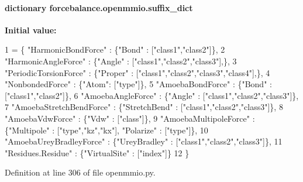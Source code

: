 \hypertarget{namespaceforcebalance_1_1openmmio_aeca37c08912f1a88339680ed75839530}{
\paragraph[{suffix\-\_\-dict}]{\setlength{\rightskip}{0pt plus 5cm}dictionary forcebalance.\-openmmio.\-suffix\-\_\-dict}}\label{namespaceforcebalance_1_1openmmio_aeca37c08912f1a88339680ed75839530}
{\bfseries Initial value\-:}
\begin{DoxyCode}
1 = \{ \textcolor{stringliteral}{"HarmonicBondForce"} : \{\textcolor{stringliteral}{"Bond"} : [\textcolor{stringliteral}{"class1"},\textcolor{stringliteral}{"class2"}]\},
2                 \textcolor{stringliteral}{"HarmonicAngleForce"} : \{\textcolor{stringliteral}{"Angle"} : [\textcolor{stringliteral}{"class1"},\textcolor{stringliteral}{"class2"},\textcolor{stringliteral}{"class3"}],\},
3                 \textcolor{stringliteral}{"PeriodicTorsionForce"} : \{\textcolor{stringliteral}{"Proper"} : [\textcolor{stringliteral}{"class1"},\textcolor{stringliteral}{"class2"},\textcolor{stringliteral}{"class3"},\textcolor{stringliteral}{"class4"}],\},
4                 \textcolor{stringliteral}{"NonbondedForce"} : \{\textcolor{stringliteral}{"Atom"}: [\textcolor{stringliteral}{"type"}]\},
5                 \textcolor{stringliteral}{"AmoebaBondForce"} : \{\textcolor{stringliteral}{"Bond"} : [\textcolor{stringliteral}{"class1"},\textcolor{stringliteral}{"class2"}]\},
6                 \textcolor{stringliteral}{"AmoebaAngleForce"} : \{\textcolor{stringliteral}{"Angle"} : [\textcolor{stringliteral}{"class1"},\textcolor{stringliteral}{"class2"},\textcolor{stringliteral}{"class3"}]\},
7                 \textcolor{stringliteral}{"AmoebaStretchBendForce"} : \{\textcolor{stringliteral}{"StretchBend"} : [\textcolor{stringliteral}{"class1"},\textcolor{stringliteral}{"class2"},\textcolor{stringliteral}{"class3"}]\},
8                 \textcolor{stringliteral}{"AmoebaVdwForce"} : \{\textcolor{stringliteral}{"Vdw"} : [\textcolor{stringliteral}{"class"}]\},
9                 \textcolor{stringliteral}{"AmoebaMultipoleForce"} : \{\textcolor{stringliteral}{"Multipole"} : [\textcolor{stringliteral}{"type"},\textcolor{stringliteral}{"kz"},\textcolor{stringliteral}{"kx"}], \textcolor{stringliteral}{"Polarize"} : [\textcolor{stringliteral}{"type"}]\},
10                 \textcolor{stringliteral}{"AmoebaUreyBradleyForce"} : \{\textcolor{stringliteral}{"UreyBradley"} : [\textcolor{stringliteral}{"class1"},\textcolor{stringliteral}{"class2"},\textcolor{stringliteral}{"class3"}]\},
11                 \textcolor{stringliteral}{"Residues.Residue"} : \{\textcolor{stringliteral}{"VirtualSite"} : [\textcolor{stringliteral}{"index"}]\}
12                 \}
\end{DoxyCode}


Definition at line 306 of file openmmio.\-py.

